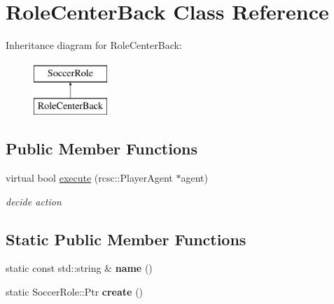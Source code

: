 \hypertarget{classRoleCenterBack}{
\section{RoleCenterBack Class Reference}
\label{classRoleCenterBack}
}
Inheritance diagram for RoleCenterBack:\begin{figure}[H]
\begin{center}
\leavevmode
\includegraphics[height=2.000000cm]{classRoleCenterBack}
\end{center}
\end{figure}
\subsection*{Public Member Functions}
\begin{DoxyCompactItemize}
\item 
\hypertarget{classRoleCenterBack_a6739589c31346a6d79a19a835750959f}{
virtual bool \hyperlink{classRoleCenterBack_a6739589c31346a6d79a19a835750959f}{execute} (rcsc::PlayerAgent $\ast$agent)}
\label{classRoleCenterBack_a6739589c31346a6d79a19a835750959f}

\begin{DoxyCompactList}\small\item\em decide action \item\end{DoxyCompactList}\end{DoxyCompactItemize}
\subsection*{Static Public Member Functions}
\begin{DoxyCompactItemize}
\item 
\hypertarget{classRoleCenterBack_a94a569eafb8467294ef9bc312575c1b0}{
static const std::string \& {\bfseries name} ()}
\label{classRoleCenterBack_a94a569eafb8467294ef9bc312575c1b0}

\item 
\hypertarget{classRoleCenterBack_aedbfd48e397e7871ad117047da1783d2}{
static SoccerRole::Ptr {\bfseries create} ()}
\label{classRoleCenterBack_aedbfd48e397e7871ad117047da1783d2}

\end{DoxyCompactItemize}
